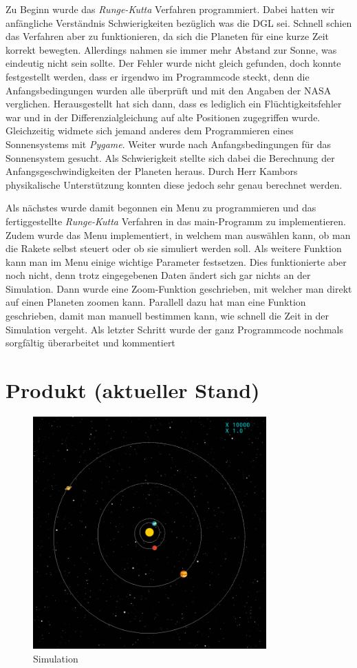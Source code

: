 \documentclass{article}
\begin{document}
Zu Beginn wurde das \textit{Runge-Kutta} Verfahren programmiert. Dabei hatten wir anfängliche Verständnis Schwierigkeiten bezüglich was die DGL sei. Schnell schien das Verfahren aber zu funktionieren, da sich die Planeten für eine kurze Zeit korrekt bewegten. Allerdings nahmen sie immer mehr Abstand zur Sonne, was eindeutig nicht sein sollte.  Der Fehler wurde nicht gleich gefunden, doch konnte festgestellt werden, dass er irgendwo im Programmcode steckt, denn die Anfangsbedingungen wurden alle überprüft und mit den Angaben der NASA verglichen. Herausgestellt hat sich dann, dass es lediglich ein Flüchtigkeitsfehler war und in der Differenzialgleichung auf alte Positionen zugegriffen wurde.
Gleichzeitig widmete sich jemand anderes dem Programmieren eines Sonnensystems mit \textit{Pygame}. Weiter wurde nach Anfangsbedingungen für das Sonnensystem gesucht. Als Schwierigkeit stellte sich dabei die Berechnung der Anfangsgeschwindigkeiten der Planeten heraus. Durch Herr Kambors physikalische Unterstützung konnten diese jedoch sehr genau berechnet werden. 

Als nächstes wurde damit begonnen ein Menu zu programmieren und das fertiggestellte \textit{Runge-Kutta} Verfahren in das main-Programm zu implementieren.  Zudem wurde das Menu implementiert, in welchem man auswählen kann, ob man die Rakete selbst steuert oder ob sie simuliert werden soll. Als weitere Funktion kann man im Menu einige wichtige Parameter festsetzen. Dies funktionierte aber noch nicht, denn trotz eingegebenen Daten ändert sich gar nichts an der Simulation. Dann wurde eine Zoom-Funktion geschrieben, mit welcher man direkt auf einen Planeten zoomen kann. Parallell dazu hat man eine Funktion geschrieben, damit man manuell bestimmen kann, wie schnell die Zeit in der Simulation vergeht. 
Als letzter Schritt wurde der ganz Programmcode nochmals sorgfältig überarbeitet und kommentiert

\section{Produkt (aktueller Stand)}
\begin{figure}[hbt]
	\centering
		\includegraphics[width=0.8\textwidth]{game.png}
	\caption{Simulation}
	\label{img:simulation}
\end{figure}
\end{document}
